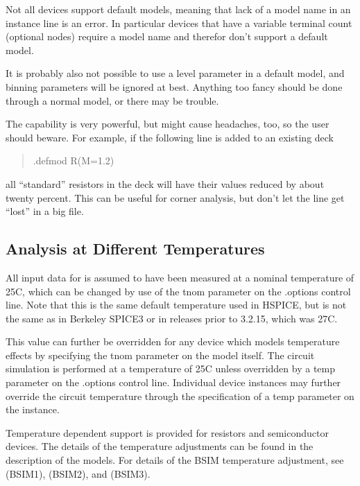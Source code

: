 Not all devices support default models, meaning that lack of a model
name in an instance line is an error.  In particular devices that have
a variable terminal count (optional nodes) require a model name and
therefor don't support a default model.

It is probably also not possible to use a {\vt level} parameter in a
default model, and binning parameters will be ignored at best. 
Anything too fancy should be done through a normal model, or there may
be trouble.

The capability is very powerful, but might cause headaches, too, so
the user should beware.  For example, if the following line is added
to an existing deck
\begin{quote}\vt
.defmod R(M=1.2)
\end{quote}
all ``standard'' resistors in the deck will have their values reduced
by about twenty percent.  This can be useful for corner analysis, but
don't let the line get ``lost'' in a big file.


\subsection{Analysis at Different Temperatures}


All input data for {\WRspice} is assumed to have been measured at a
nominal temperature of 25C, which can be changed by use of the {\vt
tnom} parameter on the {\vt .options} control line.
Note that this is the same default temperature used in HSPICE, but is
not the same as in Berkeley SPICE3 or in {\WRspice} releases prior to
3.2.15, which was 27C.

This value can further be overridden for any device which models
temperature effects by specifying the {\vt tnom} parameter on the
model itself.  The circuit simulation is performed at a temperature of
25C unless overridden by a {\vt temp} parameter on the {\vt .options}
control line.  Individual device instances may further override the
circuit temperature through the specification of a {\vt temp}
parameter on the instance.

Temperature dependent support is provided for resistors and
semiconductor devices.  The details of the temperature adjustments can
be found in the description of the models.  For details of the BSIM
temperature adjustment, see \cite{park} (BSIM1), \cite{szeto} (BSIM2),
and \cite{bsim3} (BSIM3).

